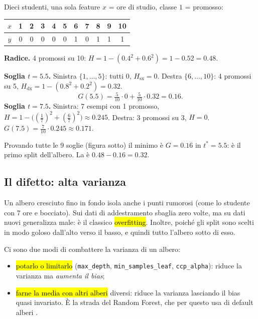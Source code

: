 \begin{esempio}
Dieci studenti, una sola feature $x$ = ore di studio, classe $1$ = promosso:
\begin{center}
\small
\begin{tabular}{c|cccccccccc}
$x$ & 1&2&3&4&5&6&7&8&9&10\\\hline
$y$ & 0&0&0&0&0&1&0&1&1&1
\end{tabular}
\end{center}
\textbf{Radice.} 4 promossi su 10: $H=1-(0.4^2+0.6^2)=1-0.52=\mathbf{0.48}$.

\textbf{Soglia $t=5.5$.} Sinistra $\{1,\dots,5\}$: tutti 0, $H_{\mathrm{sx}}=0$. Destra $\{6,\dots,10\}$: 4 promossi su 5, $H_{\mathrm{dx}}=1-(0.8^2+0.2^2)=0.32$.
\[
G(5.5)=\tfrac{5}{10}\cdot 0+\tfrac{5}{10}\cdot 0.32=\mathbf{0.16}.
\]
\textbf{Soglia $t=7.5$.} Sinistra: 7 esempi con 1 promosso, $H=1-\big((\tfrac17)^2+(\tfrac67)^2\big)\approx0.245$. Destra: 3 promossi su 3, $H=0$. $G(7.5)=\tfrac{7}{10}\cdot0.245\approx\mathbf{0.171}$.

Provando tutte le 9 soglie (figura sotto) il minimo è $G=0.16$ in $t^*=5.5$: è il primo split dell'albero. La  è $0.48-0.16=0.32$.
\end{esempio}

\par\noindent\begin{minipage}{\linewidth}
\end{minipage}\par

\subsection{Il difetto: alta varianza}

Un albero cresciuto fino in fondo isola anche i punti rumorosi (come lo studente con 7 ore e bocciato). Sui dati di addestramento sbaglia zero volte, ma su dati nuovi generalizza male: è il classico \hl{overfitting}. Inoltre, poiché gli split sono scelti in modo goloso dall'alto verso il basso,  e quindi tutto l'albero sotto di esso.

\begin{attenzione}
Ci sono due modi di combattere la varianza di un albero:
\begin{itemize}
  \item \hl{potarlo o limitarlo} (\texttt{max\_depth}, \texttt{min\_samples\_leaf}, \texttt{ccp\_alpha}): riduce la varianza ma \emph{aumenta il bias};
  \item \hl{farne la media con altri alberi} diversi: riduce la varianza lasciando il bias quasi invariato. È la strada del Random Forest, che per questo usa di default alberi .
\end{itemize}
\end{attenzione}


